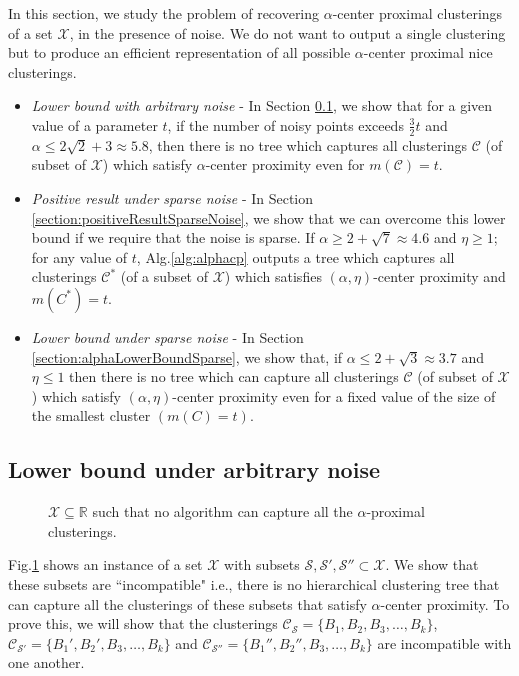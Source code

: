 \documentclass[anon,12pt]{colt2016} %
\newcommand{\mc}{\mathcal}
\begin{document}
In this section, we study the problem of recovering $\alpha$-center proximal clusterings of a set $\mc X$, in the presence of noise. We do not want to output a single clustering but to produce an efficient representation of all possible $\alpha$-center proximal nice clusterings.

\begin{itemize}
\item {\it Lower bound with arbitrary noise} - In Section \ref{section:alphaLowerBoundArbitrary}, we show that for a given value of a parameter $t$, if the number of noisy points exceeds $\frac{3}{2}t$ and $\alpha \le 2\sqrt{2} + 3 \approx 5.8$, then there is no tree which captures all clusterings $\mc C$ (of subset of $\mc X$) which satisfy $\alpha$-center proximity even for $m(\mc C) = t$.
\item  {\it Positive result under sparse noise} - In Section \ref{section:positiveResultSparseNoise}, we show that we can overcome this lower bound if we require that the noise is sparse. If $\alpha \ge 2 + \sqrt{7} \approx 4.6$ and $\eta \ge 1$; for any value of $t$, Alg.\ref{alg:alphacp} outputs a tree which captures all clusterings $\mc C^*$ (of a subset of $\mc X$) which satisfies $(\alpha, \eta)$-center proximity and $m(C^*)=t$.
\item  {\it Lower bound under sparse noise} - In Section \ref{section:alphaLowerBoundSparse}, we show that, if $\alpha \le 2 + \sqrt{3} \approx 3.7$ and $\eta \le 1$ then there is no tree which can capture all clusterings $\mc C$ (of subset of $\mc X$) which satisfy $(\alpha, \eta)$-center proximity even for a fixed value of the size of the smallest cluster $(m(C) = t)$.
\end{itemize} 


\subsection{Lower bound under arbitrary noise}
\label{section:alphaLowerBoundArbitrary}

\begin{figure}

\caption{$\mc X \subseteq \mathbb{R}$ such that no algorithm can capture all the $\alpha$-proximal clusterings. } 
\label{fig:nosparsealg}
\end{figure}

Fig.\ref{fig:nosparsealg} shows an instance of a set $\mc X$ with subsets $\mc S, \mc S', \mc S'' \subset \mc X$. We show that these subsets are ``incompatible" i.e., there is no  hierarchical clustering tree that can capture all the clusterings of these subsets that satisfy $\alpha$-center proximity. To prove this, we will show that the clusterings $\mc C_{\mc S} = \{B_1, B_2, B_3, \ldots, B_k\}$, $\mc C_{\mc S'} = \{B_1', B_2', B_3, \ldots, B_k\}$ and $\mc C_{\mc S''} = \{B_1'', B_2'', B_3, \ldots, B_k\}$ are incompatible with one another.
\end{document}
